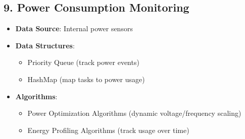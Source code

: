 \documentclass{article}
\begin{document}
\subsection{9. Power Consumption Monitoring}
\begin{itemize}
    \item \textbf{Data Source}: Internal power sensors
    \item \textbf{Data Structures}:
    \begin{itemize}
        \item Priority Queue (track power events)
        \item HashMap (map tasks to power usage)
    \end{itemize}
    \item \textbf{Algorithms}:
    \begin{itemize}
        \item Power Optimization Algorithms (dynamic voltage/frequency scaling)
        \item Energy Profiling Algorithms (track usage over time)
    \end{itemize}
\end{itemize}
\end{document}
